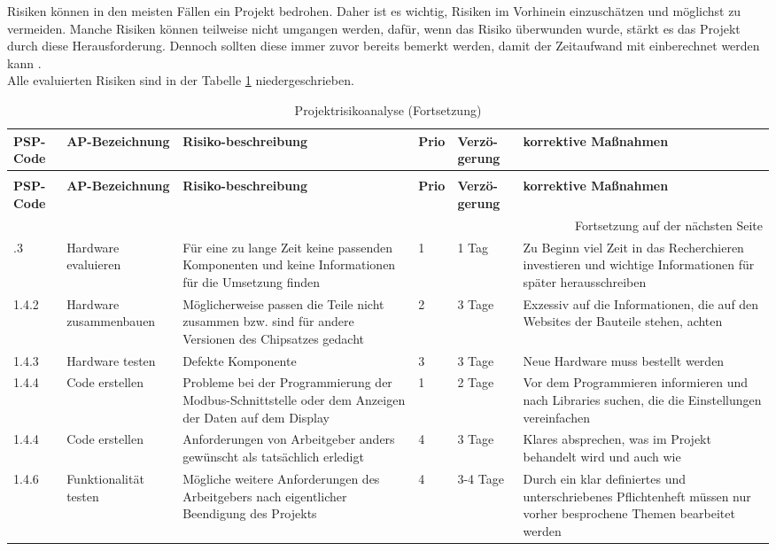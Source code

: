 Risiken können in den meisten Fällen ein Projekt bedrohen. Daher ist es wichtig, Risiken im Vorhinein einzuschätzen und möglichst zu vermeiden. Manche Risiken können teilweise nicht umgangen werden, dafür, wenn das Risiko überwunden wurde, stärkt es das Projekt durch diese Herausforderung. Dennoch sollten diese immer zuvor bereits bemerkt werden, damit der Zeitaufwand mit einberechnet werden kann \cite[vgl.][]{timetrackapp:2021}. \\
Alle evaluierten Risiken sind in der Tabelle \ref{tab:risikoanalyse} niedergeschrieben.

\begin{longtable}{p{} | p{} | p{} | p{} | p{} | p{}}
	\caption{Projektrisikoanalyse}
	\label{tab:risikoanalyse}
	\\ \toprule
	\textbf{PSP-Code} & \textbf{AP-Bezeichnung} & \textbf{Risiko-beschreibung} & \textbf{Prio} & \textbf{Verzö-gerung} & \textbf{korrektive Maßnahmen}
	\\ \midrule
	\endfirsthead
	\caption{Projektrisikoanalyse (Fortsetzung)}
	\\ \toprule
		\textbf{PSP-Code} & \textbf{AP-Bezeichnung} & \textbf{Risiko-beschreibung} & \textbf{Prio} & \textbf{Verzö-gerung} & \textbf{korrektive Maßnahmen}
	\\ \midrule
	\endhead
	\midrule
	\multicolumn{6}{r}{{Fortsetzung auf  der nächsten Seite}} 
	\\ \bottomrule
	\endfoot
	\bottomrule
	\endlastfoot
	1.3.3 & Hardware evaluieren &  Für eine zu lange Zeit keine passenden Komponenten und keine Informationen für die Umsetzung finden & 1 & 1 Tag & Zu Beginn viel Zeit in das Recherchieren investieren und wichtige Informationen für später herausschreiben \\ \midrule
	1.4.2 & Hardware zusammenbauen & Möglicherweise passen die Teile nicht zusammen bzw. sind für andere Versionen des Chipsatzes gedacht & 2 & 3 Tage & Exzessiv auf die Informationen, die auf den Websites der Bauteile stehen, achten  \\
	1.4.3 & Hardware testen & Defekte Komponente & 3 & 3 Tage & Neue Hardware muss bestellt werden \\ \midrule
	1.4.4 & Code erstellen & Probleme bei der Programmierung der Modbus-Schnittstelle oder dem Anzeigen der Daten auf dem Display & 1 & 2 Tage & Vor dem Programmieren informieren und nach Libraries suchen, die die Einstellungen vereinfachen \\ \midrule
	1.4.4 & Code erstellen & Anforderungen von Arbeitgeber anders gewünscht als tatsächlich erledigt & 4 & 3 Tage & Klares absprechen, was im Projekt behandelt wird und auch wie \\ 
	1.4.6 & Funktionalität testen & Mögliche weitere Anforderungen des Arbeitgebers nach eigentlicher Beendigung des Projekts  & 4 & 3-4 Tage & Durch ein klar definiertes und unterschriebenes Pflichtenheft müssen nur vorher besprochene Themen bearbeitet werden \\
\end{longtable}
